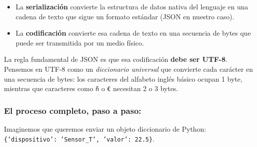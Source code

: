 \begin{itemize}
    \item La \textbf{serialización} convierte la estructura de datos nativa del lenguaje en una cadena de texto que sigue un formato estándar (JSON en nuestro caso).
    \item La \textbf{codificación} convierte esa cadena de texto en una secuencia de bytes que puede ser transmitida por un medio físico.
\end{itemize}

La regla fundamental de JSON es que esa codificación \textbf{debe ser UTF-8}. Pensemos en UTF-8 como un \emph{diccionario universal} que convierte cada carácter en una secuencia de bytes: los caracteres del alfabeto inglés básico ocupan 1 byte, mientras que caracteres como \texttt{ñ} o \texttt{€} necesitan 2 o 3 bytes.

\subsubsection*{El proceso completo, paso a paso:}

Imaginemos que queremos enviar un objeto diccionario de Python: \texttt{\{'dispositivo': 'Sensor\_T', 'valor': 22.5\}}.

